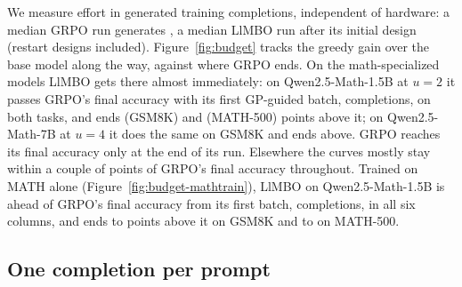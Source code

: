 \documentclass[twoside]{article}
\newcommand{\llmbo}{LlMBO}
\begin{document}
We measure effort in generated training completions, independent of hardware: a median GRPO run generates \grpoCompletions{}, a median \llmbo{} run \boCompletions{} after its initial design (restart designs included).
Figure~\ref{fig:budget} tracks the greedy gain over the base model along the way, against where GRPO ends.
On the math-specialized models \llmbo{} gets there almost immediately: on Qwen2.5-Math-1.5B at $u = 2$ it passes GRPO's final accuracy with its first GP-guided batch, \reachGreedyMathSmallUTwoGsm{} completions, on both tasks, and ends \budgetEndGreedyMathSmallUTwoGsm{} (GSM8K) and \budgetEndGreedyMathSmallUTwoMathFive{} (MATH-500) points above it; on Qwen2.5-Math-7B at $u = 4$ it does the same on GSM8K and ends \budgetEndGreedyMathUFourGsm{} above. GRPO reaches its final accuracy only at the end of its run. Elsewhere the curves mostly stay within a couple of points of GRPO's final accuracy throughout. Trained on MATH alone (Figure~\ref{fig:budget-mathtrain}), \llmbo{} on Qwen2.5-Math-1.5B is ahead of GRPO's final accuracy from its first batch, \reachGreedyMathSmallUOneGsmMathTrain{} completions, in all six columns, and ends \budgetEndGreedyMathSmallUFourGsmMathTrain{} to \budgetEndGreedyMathSmallUTwoGsmMathTrain{} points above it on GSM8K and \budgetEndGreedyMathSmallUOneMathFiveMathTrain{} to \budgetEndGreedyMathSmallUTwoMathFiveMathTrain{} on MATH-500.
\subsection{One completion per prompt}
\label{sec:one-per-prompt}

\begin{table}[!htbp]
\centering
\caption{Correlation between completions of the same prompt, per model, from GRPO's first \designSteps{} steps at $u \le 4$, close to the base model, at $T = 1$ on the training tier. \emph{Equal-reward groups}: groups of \grpoGroup{} completions of one prompt that all get the same reward, as observed and as expected if the completions were independent at the same pass rate; such groups give GRPO no gradient. $\rho$: intraclass correlation of the beta-binomial matching pass rate and observed equal-reward groups; $1 + 3\rho$: variance inflation of a pass-rate estimate from groups of \grpoGroup{} over one completion per prompt; $k_\mathrm{eff} = 4 / (1 + 3\rho)$: independent completions a group is worth.}
\label{tab:design}

\end{table}
\end{document}
